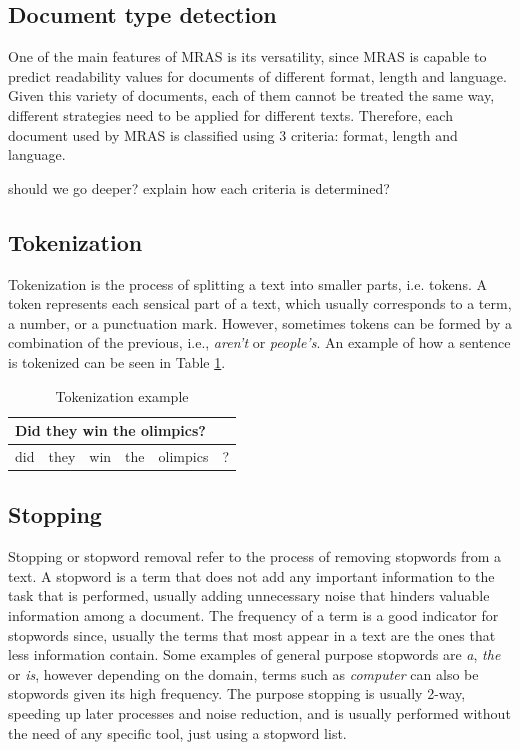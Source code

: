 \documentclass{bsu-ms}
\newcommand{\projectName}{MRAS\xspace}
\begin{document}
\subsection{Document type detection}
One of the main features of \projectName is its versatility, since \projectName is capable to predict readability values for documents of different format, length and language. Given this variety of documents, each of them cannot be treated the same way, different strategies need to be applied for different texts. Therefore, each document used by \projectName  is classified using 3 criteria: format, length and language.


{\color{red} should we go deeper? explain how each criteria is determined?}


\subsection{Tokenization}
Tokenization is the process of splitting a text into smaller parts, i.e. tokens. A token represents each sensical part of a text, which usually corresponds to a term, a number, or a punctuation mark. However, sometimes tokens can be formed by a combination of the previous, i.e., \emph{aren't} or \emph{people's}. An example of how a sentence is tokenized can be seen in Table \ref{tab:tokenization}.

\begin{table}[h]
\centering
\begin{tabular}{|l|l|l|l|l|l|}
\hline
\multicolumn{6}{|l|}{Did they win the olimpics?} \\ \hline
did & they & win & the & olimpics & ? \\ \hline
\end{tabular}
\caption{Tokenization example}
\label{tab:tokenization}
\end{table}

\subsection{Stopping}
Stopping or stopword removal refer to the process of removing stopwords from a text. A stopword is a term that does not add any important information to the task that is performed, usually adding unnecessary noise that hinders valuable information among a document. The frequency of a term is a good indicator for stopwords since, usually the terms that most appear in a text are the ones that less information contain. Some examples of general purpose stopwords are \emph{a}, \emph{the} or \emph{is}, however depending on the domain, terms such as \emph{computer} can also be stopwords given its high frequency. The purpose stopping is usually 2-way, speeding up later processes and noise reduction, and is usually performed without the need of any specific tool, just using a stopword list.
\end{document}

